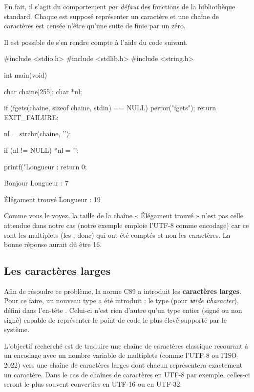 En fait, il s'agit du comportement \emph{par défaut} des fonctions de la
bibliothèque standard. Chaque  est supposé représenter un
caractère et une chaîne de caractères est censée n'être qu'une suite de
 finie par un zéro.

Il est possible de s'en rendre compte à l'aide du code suivant.

\begin{C}
#include <stdio.h>
#include <stdlib.h>
#include <string.h>


int main(void)
{
    char chaine[255];
    char *nl;

    if (fgets(chaine, sizeof chaine, stdin) == NULL)
    {
        perror("fgets");
        return EXIT_FAILURE;
    }

    nl = strchr(chaine, '\n');

    if (nl != NULL)
        *nl = '\0';

    printf("Longueur : %
    return 0;
}
\end{C}

\begin{C}
Bonjour   
Longueur : 7

Élégament trouvé
Longueur : 19
\end{C}

Comme vous le voyez, la taille de la chaîne « Élégament trouvé » n'est
pas celle attendue dans notre cas (notre exemple emploie l'UTF-8 comme
encodage) car ce sont les multiplets (les , donc) qui ont
été comptés et non les caractères. La bonne réponse aurait dû être 16.

\subsection{Les caractères larges}
\label{les-caracteres-larges}

Afin de résoudre ce problème, la norme C89 a introduit les
\textbf{caractères larges}. Pour ce faire, un nouveau type a été
introduit : le type  (pour \emph{\textbf{w}ide
\textbf{c}haracter}), défini dans l'en-tête
. Celui-ci n'est rien d'autre
qu'un type entier (signé ou non signé) capable de représenter le point
de code le plus élevé supporté par le système.

L'objectif recherché est de traduire une chaîne de caractères classique
recourant à un encodage avec un nombre variable de multiplets (comme
l'UTF-8 ou l'ISO-2022) vers une chaîne de caractères larges dont chacun
représentera exactement un caractère. Dans le cas de chaînes de
caractères en UTF-8 par exemple, celles-ci seront le plus souvent
converties en UTF-16 ou en UTF-32.

